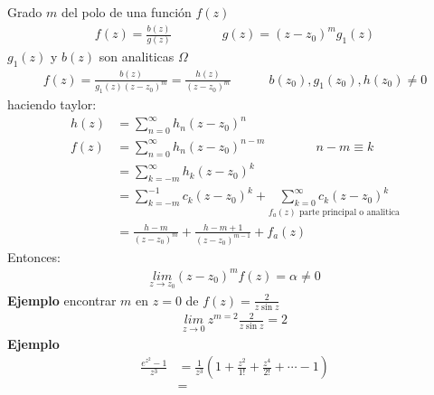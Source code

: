 \documentclass{article}
\begin{document}
\section{}
Grado $ m  $ del polo de una función $ f(z)  $ 
\begin{gather*}
  f(z) = \frac{b(z) }{g(z) } \qquad \qquad g(z) = (z-z_0 ) ^ {m } g_1(z)  
\end{gather*}
$ g_1(z) $ y $ b(z)  $ son analiticas $ \Omega $
\begin{gather*}
  f(z) = \frac{b(z) }{g_1(z)(z-z_0)^m} = \frac{h (z) }{(z-z_0)^ {m }} \qquad \quad b(z_0), g_1(z_0), h(z_0) \neq 0 
\end{gather*}
haciendo taylor: 
\begin{align*}
  h(z) &= \displaystyle\sum_{n=0 }^{\infty} h_n (z-z_0 )^ {n } \\
  f\left(z\right) &= \displaystyle\sum_{n=0 }^{\infty} h_n (z-z_0)^ {n-m } \qquad \qquad n-m \equiv k \\
       &= \displaystyle\sum_{k = -m }^{\infty}h_k (z-z_0)^ {k }\\
       &= \displaystyle\sum_{k = -m }^{-1 }c_k (z-z_0)^ {k } + \underset{f_a(z) \text{ parte principal o analitica} }{\displaystyle\sum_{k=0 }^{\infty}c_k (z-z_0)^ {k }}\\
       &= \frac{h-m }{(z-z_0 )^ {m }} + \frac{h -m + 1 }{(z-z_0)^ {m-1 }} + f_a(z) 
\end{align*}
Entonces: 
\begin{gather*}
  \underset{z \rightarrow z_0 }{lim}(z-z_0)^ {m }f(z) = \alpha\neq 0  
\end{gather*}
\textbf{Ejemplo } encontrar $ m  $ en $ z= 0  $ de $ f(z) = \frac{2 }{z \sin{z }} $
\begin{gather*}
  \underset{z \rightarrow 0 }{lim}\ z ^ {m=2 } \frac{2 }{z \sin{z }} = 2
\end{gather*}
\textbf{Ejemplo } 
\begin{align*}
  \frac{e ^ {z ^ {2 }}- 1 }{z ^ {3 }}  &= \frac{1}{z^3 } \left(1 + \frac{z ^ {2 }}{1! } + \frac{z ^ {4 }}{2! } + \cdots - 1 \right) \\
  &=
\end{align*}
\end{document}
